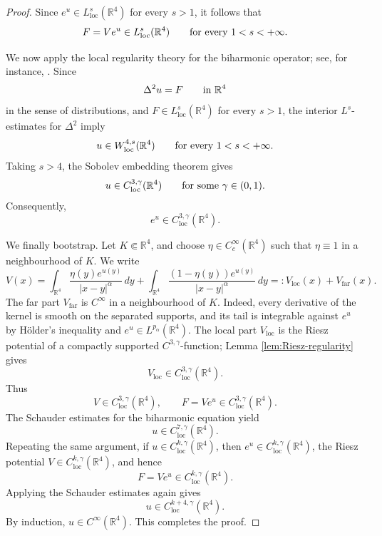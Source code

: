 \documentclass[11pt]{article}
\numberwithin{equation}{section}
\begin{document}
\begin{proof}
Since \(e^{u}\in L^{s}_{\operatorname{loc}}(\mathbb R^{4})\) for every \(s>1\), it follows that
\[
F=Ve^{u}\in L^{s}_{\operatorname{loc}}(\mathbb R^{4})
\qquad \hbox{for every } 1<s<+\infty .
\]

We now apply the local regularity theory for the biharmonic operator; see, for instance, \cite{GazzolaGrunauSweers}. Since
\[
\Delta^{2}u=F
\qquad \hbox{in } \mathbb R^{4}
\]
in the sense of distributions, and \(F\in L^{s}_{\operatorname{loc}}(\mathbb R^{4})\) for every \(s>1\), the interior \(L^{s}\)-estimates for \(\Delta^{2}\) imply
\[
u\in W^{4,s}_{\operatorname{loc}}(\mathbb R^{4})
\qquad \hbox{for every } 1<s<+\infty .
\]
Taking \(s>4\), the Sobolev embedding theorem gives
\[
u\in C^{3,\gamma}_{\operatorname{loc}}(\mathbb R^{4})
\qquad \hbox{for some } \gamma\in(0,1).
\]
Consequently,
\[
e^{u}\in C^{3,\gamma}_{\operatorname{loc}}(\mathbb R^{4}).
\]

We finally bootstrap. Let \(K\Subset\mathbb R^{4}\), and choose \(\eta\in C_{c}^{\infty}(\mathbb R^{4})\) such that \(\eta\equiv1\) in a neighbourhood of \(K\). We write
\[
V(x)
=
\int_{\mathbb R^{4}}
\frac{\eta(y)e^{u(y)}}{|x-y|^{\alpha}}\,dy
+
\int_{\mathbb R^{4}}
\frac{(1-\eta(y))e^{u(y)}}{|x-y|^{\alpha}}\,dy
=:V_{\operatorname{loc}}(x)+V_{\operatorname{far}}(x).
\]
The far part \(V_{\operatorname{far}}\) is \(C^{\infty}\) in a
neighbourhood of \(K\). Indeed, every derivative of the kernel is smooth on
the separated supports, and its tail is integrable against \(e^{u}\) by
H\"older's inequality and \(e^{u}\in L^{p_{\alpha}}(\mathbb R^{4})\).
The local part \(V_{\operatorname{loc}}\) is the Riesz potential of a
compactly supported \(C^{3,\gamma}\)-function; Lemma
\ref{lem:Riesz-regularity} gives
\[
V_{\operatorname{loc}}\in C^{3,\gamma}_{\operatorname{loc}}(\mathbb R^{4}).
\]
Thus
\[
V\in C^{3,\gamma}_{\operatorname{loc}}(\mathbb R^{4}),
\qquad
F=Ve^{u}\in C^{3,\gamma}_{\operatorname{loc}}(\mathbb R^{4}).
\]
The Schauder estimates for the biharmonic equation yield
\[
u\in C^{7,\gamma}_{\operatorname{loc}}(\mathbb R^{4}).
\]
Repeating the same argument, if \(u\in C^{k,\gamma}_{\operatorname{loc}}(\mathbb R^{4})\), then \(e^{u}\in C^{k,\gamma}_{\operatorname{loc}}(\mathbb R^{4})\), the Riesz potential \(V\in C^{k,\gamma}_{\operatorname{loc}}(\mathbb R^{4})\), and hence
\[
F=Ve^{u}\in C^{k,\gamma}_{\operatorname{loc}}(\mathbb R^{4}).
\]
Applying the Schauder estimates again gives
\[
u\in C^{k+4,\gamma}_{\operatorname{loc}}(\mathbb R^{4}).
\]
By induction,
$
u\in C^{\infty}(\mathbb R^{4}).
$
This completes the proof.
\end{proof}
\end{document}
